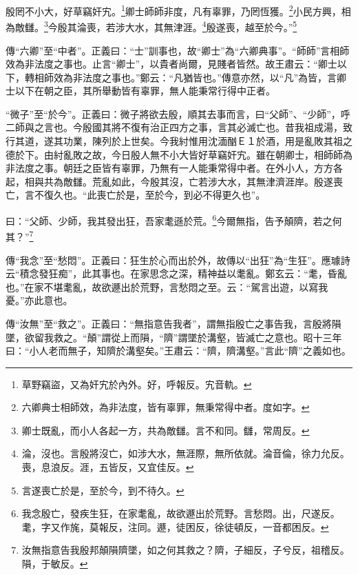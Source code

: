 殷罔不小大，好草竊奸宄。\footnote{草野竊盜，又為奸宄於內外。好，呼報反。宄音軌。}卿士師師非度，凡有辜罪，乃罔恆獲。\footnote{六卿典士相師效，為非法度，皆有辜罪，無秉常得中者。度如字。}小民方興，相為敵讎。\footnote{卿士既亂，而小人各起一方，共為敵讎。言不和同。讎，常周反。}今殷其淪喪，若涉大水，其無津涯。\footnote{淪，沒也。言殷將沒亡，如涉大水，無涯際，無所依就。淪音倫，徐力允反。喪，息浪反。涯，五皆反，又宜佳反。}殷遂喪，越至於今。”\footnote{言遂喪亡於是，至於今，到不待久。}

{\noindent\zhuan{}\fzbyks 傳“六卿”至“中者”。正義曰：“士”訓事也，故“卿士”為“六卿典事”。“師師”言相師效為非法度之事也。止言“卿士”，以貴者尚爾，見賤者皆然。故王肅云：“卿士以下，轉相師效為非法度之事也。”鄭云：“凡猶皆也。”傳意亦然，以“凡”為皆，言卿士以下在朝之臣，其所舉動皆有辜罪，無人能秉常行得中正者。 \par}

{\noindent\shu{}\fzkt “微子”至“於今”。正義曰：微子將欲去殷，順其去事而言，曰“父師”、“少師”，呼二師與之言也。今殷國其將不復有治正四方之事，言其必滅亡也。昔我祖成湯，致行其道，遂其功業，陳列於上世矣。今我紂惟用沈湎酗Ｅ１於酒，用是亂敗其祖之德於下。由紂亂敗之故，今日殷人無不小大皆好草竊奸宄。雖在朝卿士，相師師為非法度之事。朝廷之臣皆有辜罪，乃無有一人能秉常得中者。在外小人，方方各起，相與共為敵讎。荒亂如此，今殷其沒，亡若涉大水，其無津濟涯岸。殷遂喪亡，言不復久也。“此喪亡於是，至於今，到必不得更久也”。 \par}

曰：“父師、少師，我其發出狂，吾家耄遜於荒。\footnote{我念殷亡，發疾生狂，在家耄亂，故欲遯出於荒野。言愁悶。出，尺遂反。耄，字又作旄，莫報反，注同。遯，徒困反，徐徒頓反，一音都困反。}今爾無指，告予顛隮，若之何其？”\footnote{汝無指意告我殷邦顛隕隮墜，如之何其救之？隮，子細反，子兮反，祖稽反。隕，于敏反。}


{\noindent\zhuan{}\fzbyks 傳“我念”至“愁悶”。正義曰：狂生於心而出於外，故傳以“出狂”為“生狂”。應璩詩云“積念發狂痴”，此其事也。在家思念之深，精神益以耄亂。鄭玄云：“耄，昏亂也。”在家不堪耄亂，故欲遯出於荒野，言愁悶之至。云：“駕言出遊，以寫我憂。”亦此意也。 \par}

{\noindent\zhuan{}\fzbyks 傳“汝無”至“救之”。正義曰：“無指意告我者”，謂無指殷亡之事告我，言殷將隕墜，欲留我救之。“顛”謂從上而隕，“隮”謂墜於溝壑，皆滅亡之意也。昭十三年曰：“小人老而無子，知隮於溝壑矣。”王肅云：“隮，隮溝壑。”言此“隮”之義如也。 \par}


